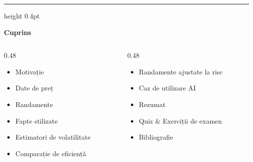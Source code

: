 \documentclass[9pt, aspectratio=169, t]{beamer}
\theoremstyle{definition}
\begin{document}
{
\begin{frame}{}
    {\color{FooterGray}\hrule height 0.4pt}
    \vspace{0.1cm}
    {\Large\textcolor{IDAred}{\textbf{Cuprins}}}
    \vspace{0.2cm}
    {\small
    \begin{columns}[T]
        \begin{column}{0.48\textwidth}
            \begin{itemize}
                \item Motivație
                \item Date de preț
                \item Randamente
                \item Fapte stilizate
                \item Estimatori de volatilitate
                \item Comparație de eficiență
            \end{itemize}
        \end{column}
        \begin{column}{0.48\textwidth}
            \begin{itemize}
                \item Randamente ajustate la risc
                \item Caz de utilizare AI
                \item Rezumat
                \item Quiz \& Exerciții de examen
                \item Bibliografie
            \end{itemize}
        \end{column}
    \end{columns}
    }
\end{frame}
}
\end{document}
